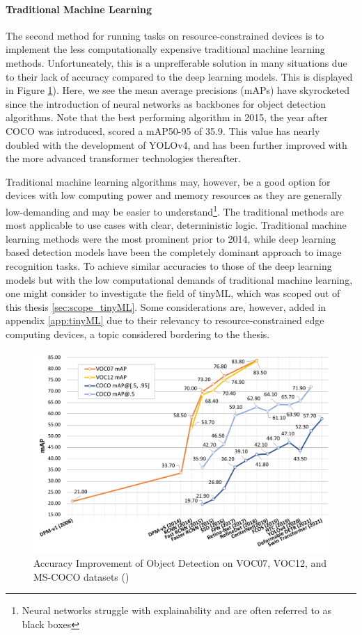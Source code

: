 \paragraph{Traditional Machine Learning}
The second method for running tasks on resource-constrained devices is to implement the less computationally expensive traditional machine learning methods. Unfortuneately, this is a unprefferable solution in many situations due to their lack of accuracy compared to the deep learning models. This is displayed in Figure \ref{fig:object_detect_20_years_improvement}). Here, we see the mean average precisions (mAPs) have skyrocketed since the introduction of neural networks as backbones for object detection algorithms. Note that the best performing algorithm in 2015, the year after COCO was introduced, scored a mAP50-95 of 35.9. This value has nearly doubled with the development of YOLOv4, and has been further improved with the more advanced transformer technologies thereafter. 

Traditional machine learning algorithms may, however, be a good option for devices with low computing power and memory resources as they are generally low-demanding and may be easier to understand\footnote{Neural networks struggle with explainability and are often referred to as black boxes}. The traditional methods are most applicable to use cases with clear, deterministic logic. Traditional machine learning methods were the most prominent prior to 2014, while deep learning based detection models have been the completely dominant approach to image recognition tasks. To achieve similar accuracies to those of the deep learning models but with the low computational demands of traditional machine learning, one might consider to investigate the field of tinyML, which was scoped out of this thesis \ref{sec:scope_tinyML}. Some considerations are, however, added in appendix \ref{app:tinyML} due to their relevancy to resource-constrained edge computing devices, a topic considered bordering to the thesis.

\begin{figure}[H]
    \centering
    \includegraphics[width=1\linewidth]{Images/Diagrams/object-detection-improvements.png}
    \caption{Accuracy Improvement of Object Detection on VOC07, VOC12, and MS-COCO datasets (\cite{zou2023object_detection_in_20_years})}
    \label{fig:object_detect_20_years_improvement}
\end{figure}

